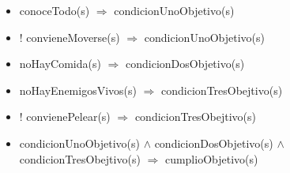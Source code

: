 \begin{itemize}
\item conoceTodo(s) $\Rightarrow$ condicionUnoObjetivo(s)
\item ! convieneMoverse(s) $\Rightarrow$ condicionUnoObjetivo(s)
\item noHayComida(s) $\Rightarrow$ condicionDosObjetivo(s)
\item noHayEnemigosVivos(s) $\Rightarrow$ condicionTresObejtivo(s)
\item ! convienePelear(s) $\Rightarrow$ condicionTresObejtivo(s)

\item  condicionUnoObjetivo(s) $\land$ condicionDosObjetivo(s)
$\land$ condicionTresObejtivo(s) $\Rightarrow$ cumplioObjetivo(s)

\end{itemize}


